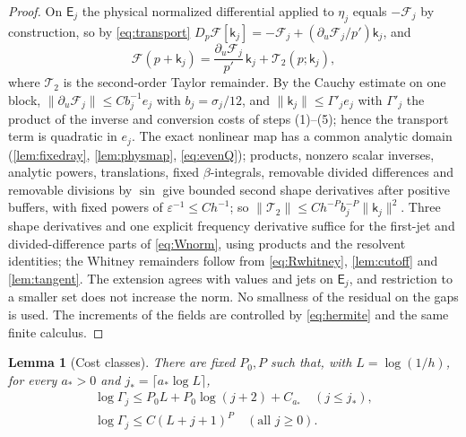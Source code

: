 \documentclass[11pt]{amsart}
\numberwithin{equation}{section}
\newtheorem{lemma}[theorem]{Lemma}
\theoremstyle{definition}
\theoremstyle{remark}
\newcommand{\eps}{\varepsilon}
\newcommand{\norm}[1]{\lVert #1\rVert}
\newcommand{\cF}{\mathcal F}
\begin{document}
\begin{proof}
On $\mathsf E_j$ the physical normalized differential applied to $\eta_j$ equals $-\cF_j$ by construction, so by \eqref{eq:transport} $D_p\cF[\mathsf k_j]=-\cF_j+(\partial_u\cF_j/p')\mathsf k_j$, and
\[
\cF(p+\mathsf k_j)=\frac{\partial_u\cF_j}{p'}\,\mathsf k_j+\mathcal T_2(p;\mathsf k_j),
\]
where $\mathcal T_2$ is the second-order Taylor remainder. By the Cauchy estimate on one block, $\norm{\partial_u\cF_j}\le Cb_j^{-1}e_j$ with $b_j=\sigma_j/12$, and $\norm{\mathsf k_j}\le\Gamma'_je_j$ with $\Gamma'_j$ the product of the inverse and conversion costs of steps (1)--(5); hence the transport term is quadratic in $e_j$. The exact nonlinear map has a common analytic domain (\cref{lem:fixedray}, \cref{lem:physmap}, \eqref{eq:evenQ}); products, nonzero scalar inverses, analytic powers, translations, fixed $\beta$-integrals, removable divided differences and removable divisions by $\sin$ give bounded second shape derivatives after positive buffers, with fixed powers of $\eps^{-1}\le C h^{-1}$; so $\norm{\mathcal T_2}\le Ch^{-P}b_j^{-P}\norm{\mathsf k_j}^2$. Three shape derivatives and one explicit frequency derivative suffice for the first-jet and divided-difference parts of \eqref{eq:Wnorm}, using products and the resolvent identities; the Whitney remainders follow from \eqref{eq:Rwhitney}, \cref{lem:cutoff} and \cref{lem:tangent}. The extension agrees with values and jets on $\mathsf E_j$, and restriction to a smaller set does not increase the norm. No smallness of the residual on the gaps is used. The increments of the fields are controlled by \eqref{eq:hermite} and the same finite calculus.
\end{proof}

\begin{lemma}[Cost classes]\label{lem:costs}
There are fixed $P_0,P$ such that, with $L=\log(1/h)$, for every $a_*>0$ and $j_*=\lceil a_*\log L\rceil$,
\begin{equation}\label{eq:costs}
\begin{gathered}
\log\Gamma_j\le P_0L+P_0\log(j+2)+C_{a_*}\quad(j\le j_*),\\
\log\Gamma_j\le C(L+j+1)^P\quad(\text{all }j\ge0).
\end{gathered}
\end{equation}
\end{lemma}
\end{document}
